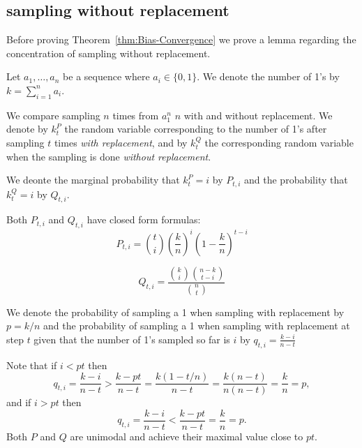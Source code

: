 \subsection{sampling without replacement}

\newcommand{\p}{p}
\newcommand{\q}{q_{t,i}}


\newcommand{\cnt}[2]{k^{#1}_{#2}}

\newcommand{\prob}[2]{#1_{#2}}

\newcommand{\tail}[3]{{\mathbf #1}^{#2}_{#3}}

\newcommand{\mode}[1]{\mbox{mode}\left(#1\right)} 
\newcommand{\fmode}[1]{Z^{#1}_t}


Before proving Theorem~\ref{thm:Bias-Convergence} we prove a 
lemma regarding the concentration of sampling without replacement.

Let $a_1,\ldots,a_n$ be a sequence where $a_i \in
\{0,1\}$. We denote the number of 1's by $k=\sum_{i=1}^n a_i$.

We compare sampling $n$ times from $a_1^n$ $n$ with and without
replacement. We denote by $\cnt{P}{t}$ the random variable
corresponding to the number of 1's after sampling $t$ times {\em with
  replacement}, and by $\cnt{Q}{t}$ the corresponding random
variable when the sampling is done {\em without replacement}.

We deonte the marginal probability that $\cnt{P}{t}=i$ by
$\prob{P}{t,i}$ and the probability that $\cnt{Q}{t}=i$ by
$\prob{Q}{t,i}$.

Both $\prob{P}{t,i}$ and $\prob{Q}{t,i}$ have closed form formulas:
\begin{equation}\label{eqn:P-closed-form}
\prob{P}{t,i} = {t \choose i} \left(\frac{k}{n}\right)^i \left(1-\frac{k}{n}\right)^{t-i}
\end{equation}

\begin{equation}\label{eqn:Q-closed-form}
\prob{Q}{t,i}=\frac{{k \choose i}{n-k \choose t-i}}{{n \choose t}}
\end{equation}

We denote the probability of sampling a 1 when sampling with
replacement by $\p=k/n$ and the probability of sampling a 1 when
sampling with replacement at step $t$ given that the number of 1's
sampled so far is $i$ by $\q=\frac{k-i}{n-t}$

Note that if $i < \p t$ then
\[
\q=\frac{k-i}{n-t} > \frac{k-\p t}{n-t} = \frac{k(1-t/n)}{n-t} =
\frac{k(n-t)}{n(n-t)} = \frac{k}{n}=\p,
\]
and if $i > \p t$ then
\[
\q=\frac{k-i}{n-t} < \frac{k-\p t}{n-t} = \frac{k}{n}=\p.
\]
Both $P$ and $Q$ are unimodal and achieve their maximal value close to
$\p t$.

